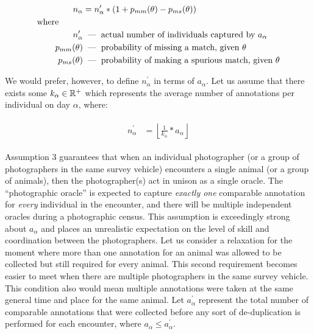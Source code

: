 \begin{align} \label{eq:matching}
    \begin{split}
        n_{\alpha} &= n^{\prime}_{\alpha} * (1 + p_{mm}(\theta) - p_{ms}(\theta)) \\
        \text{where} \hspace{1cm} & \\
        n^{\prime}_{\alpha} &\textnormal{\hspace{0.2cm}---\hspace{0.2cm}} \text{actual number of individuals captured by $a_{\alpha}$} \\
        p_{mm}(\theta) &\textnormal{\hspace{0.2cm}---\hspace{0.2cm}} \text{probability of missing a match, given $\theta$} \\
        p_{ms}(\theta) &\textnormal{\hspace{0.2cm}---\hspace{0.2cm}} \text{probability of making a spurious match, given $\theta$}
    \end{split}
\end{align}

\noindent We would prefer, however, to define $n^{\prime}_{\alpha}$ in terms of $a_{\alpha}$.  Let us assume that there exists some $k_{\alpha} \in \mathbb{R}^{+}$ which represents the average number of annotations per individual on day $\alpha$, where:

\begin{align} \label{eq:lemma_start}
    \begin{split}
        n^{\prime}_{\alpha} &= \left\lfloor \frac{1}{k_{\alpha}} * a_{\alpha} \right\rfloor
    \end{split}
\end{align}

\noindent Assumption 3 guarantees that when an individual photographer (or a group of photographers in the same survey vehicle) encounters a single animal (or a group of animals), then the photographer(s) act in unison as a single oracle.  The ``photographic oracle'' is expected to capture \textit{exactly one} comparable annotation for \textit{every} individual in the encounter, and there will be multiple independent oracles during a photographic census.  This assumption is exceedingly strong about $a_{\alpha}$ and places an unrealistic expectation on the level of skill and coordination between the photographers.  Let us consider a relaxation for the moment where more than one annotation for an animal was allowed to be collected but still required for every animal.  This second requirement becomes easier to meet when there are multiple photographers in the same survey vehicle.  This condition also would mean multiple annotations were taken at the same general time and place for the same animal.  Let $a^{\prime}_{\alpha}$ represent the total number of comparable annotations that were collected before any sort of de-duplication is performed for each encounter, where $a_{\alpha} \leq a^{\prime}_{\alpha}$.

